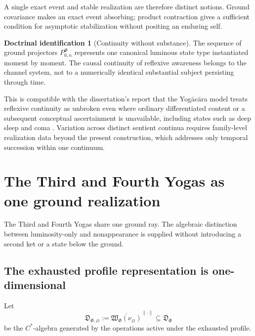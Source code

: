 \documentclass[11pt,reqno]{scrartcl}
\newcommand{\detAlg}{\mathfrak D_{\Phi}}
\newcommand{\vasEmpty}{\nu_{\varnothing}}
\newcommand{\wordSet}{\mathfrak W_{\Phi}}
\newcommand{\detAlgEmpty}{\mathfrak D_{\Phi,\varnothing}}
\theoremstyle{plain}
\theoremstyle{definition}
\newtheorem{identification}[identification]{Doctrinal identification}
\theoremstyle{remark}
\begin{document}
A single exact event and stable realization are therefore distinct notions.
Ground covariance makes an exact event absorbing; product contraction gives a
sufficient condition for asymptotic stabilization without positing an
enduring self.

\begin{identification}[Continuity without substance]
\label{id:continuity-without-substance}
The sequence of ground projectors $P_{0,n}^{\Phi}$ represents one canonical
luminous state type instantiated moment by moment.  The causal continuity of
reflexive awareness belongs to the channel system, not to a numerically
identical substantial subject persisting through time.
\end{identification}

This is compatible with the dissertation's report that the Yog\=ac\=ara model
treats reflexive continuity as unbroken even where ordinary differentiated
content or a subsequent conceptual ascertainment is unavailable, including
states such as deep sleep and coma \cite[p.~425]{Yiannopoulos2020}.  Variation
across distinct sentient continua requires family-level realization data
beyond the present construction, which addresses only temporal succession
within one continuum.
\section{The Third and Fourth Yogas as one ground realization}
\label{sec:third-fourth-yoga-same-ground}

The Third and Fourth Yogas share one ground ray.  The algebraic distinction
between luminosity-only and nonappearance is supplied without introducing a
second ket or a state below the ground.

\subsection{The exhausted profile representation is one-dimensional}

Let
\begin{equation}
  \detAlgEmpty
  :=\overline{\wordSet(\vasEmpty)}^{\|\cdot\|}
  \subseteq\detAlg
  \label{eq:exhausted-profile-Cstar-algebra}
\end{equation}
be the $C^*$-algebra generated by the operations active under the exhausted
profile.
\end{document}
